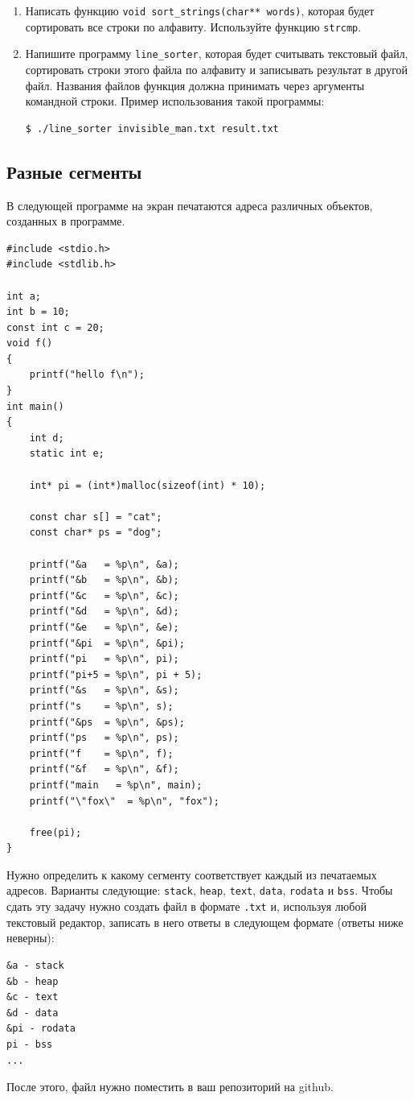 \documentclass[10pt]{article}
\begin{document}
\begin{enumerate}
\item Написать функцию \texttt{void sort\_strings(char** words)}, которая будет сортировать все строки по алфавиту. Используйте функцию \texttt{strcmp}.

\item Напишите программу \texttt{line\_sorter}, которая будет считывать текстовый файл, сортировать строки этого файла по алфавиту и записывать результат в другой файл. Названия файлов функция должна принимать через аргументы командной строки.
Пример использования такой программы:
\begin{lstlisting}
$ ./line_sorter invisible_man.txt result.txt
\end{lstlisting}
\end{enumerate}


\subsection{Разные сегменты}
В следующей программе на экран печатаются адреса различных объектов, созданных в программе.
\begin{lstlisting}
#include <stdio.h>
#include <stdlib.h>

int a;
int b = 10;
const int c = 20;
void f() 
{
    printf("hello f\n");
}
int main()
{
    int d;
    static int e; 
       
    int* pi = (int*)malloc(sizeof(int) * 10);
    
    const char s[] = "cat";
    const char* ps = "dog";
    
    printf("&a   = %p\n", &a);
    printf("&b   = %p\n", &b);
    printf("&c   = %p\n", &c);
    printf("&d   = %p\n", &d);
    printf("&e   = %p\n", &e);
    printf("&pi  = %p\n", &pi);
    printf("pi   = %p\n", pi);
    printf("pi+5 = %p\n", pi + 5);
    printf("&s   = %p\n", &s);
    printf("s    = %p\n", s);
    printf("&ps  = %p\n", &ps);
    printf("ps   = %p\n", ps);
    printf("f    = %p\n", f);
    printf("&f   = %p\n", &f);
    printf("main   = %p\n", main);
    printf("\"fox\"  = %p\n", "fox");
    
    free(pi);
}
\end{lstlisting}
Нужно определить к какому сегменту соответствует каждый из печатаемых адресов. Варианты следующие: \texttt{stack}, \texttt{heap}, \texttt{text}, \texttt{data}, \texttt{rodata} и \texttt{bss}. Чтобы сдать эту задачу нужно создать файл в формате \texttt{.txt} и, используя любой текстовый редактор, записать в него ответы в следующем формате (ответы ниже неверны):
\begin{lstlisting}
&a - stack
&b - heap
&c - text
&d - data
&pi - rodata
pi - bss
...
\end{lstlisting}
После этого, файл нужно поместить в ваш репозиторий на github.
\end{document}
